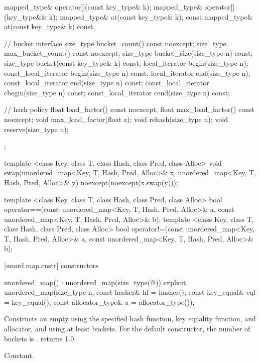 \begin{codeblock}
{{    mapped_type& operator[](const key_type& k);
    mapped_type& operator[](key_type&& k);
    mapped_type& at(const key_type& k);
    const mapped_type& at(const key_type& k) const;

    // bucket interface
    size_type bucket_count() const noexcept;
    size_type max_bucket_count() const noexcept;
    size_type bucket_size(size_type n) const;
    size_type bucket(const key_type& k) const;
    local_iterator begin(size_type n);
    const_local_iterator begin(size_type n) const;
    local_iterator end(size_type n);
    const_local_iterator end(size_type n) const;
    const_local_iterator cbegin(size_type n) const;
    const_local_iterator cend(size_type n) const;

    // hash policy
    float load_factor() const noexcept;
    float max_load_factor() const noexcept;
    void max_load_factor(float z);
    void rehash(size_type n);
    void reserve(size_type n);
  };

  template <class Key, class T, class Hash, class Pred, class Alloc>
    void swap(unordered_map<Key, T, Hash, Pred, Alloc>& x,
              unordered_map<Key, T, Hash, Pred, Alloc>& y)
      noexcept(noexcept(x.swap(y)));

  template <class Key, class T, class Hash, class Pred, class Alloc>
    bool operator==(const unordered_map<Key, T, Hash, Pred, Alloc>& a,
                    const unordered_map<Key, T, Hash, Pred, Alloc>& b);
  template <class Key, class T, class Hash, class Pred, class Alloc>
    bool operator!=(const unordered_map<Key, T, Hash, Pred, Alloc>& a,
                    const unordered_map<Key, T, Hash, Pred, Alloc>& b);
}
\end{codeblock}

[unord.map.cnstr]{ constructors}

%
\begin{itemdecl}
unordered_map() : unordered_map(size_type(@\seebelow@)) { }
explicit unordered_map(size_type n,
                       const hasher& hf = hasher(),
                       const key_equal& eql = key_equal(),
                       const allocator_type& a = allocator_type());
\end{itemdecl}

\begin{itemdescr}
\pnum
\effects Constructs an empty  using the
specified hash function, key equality function, and allocator, and
using at least  buckets.  For the default constructor,
the number of buckets is .
 returns 1.0.

\pnum
\complexity Constant.
\end{itemdescr}

